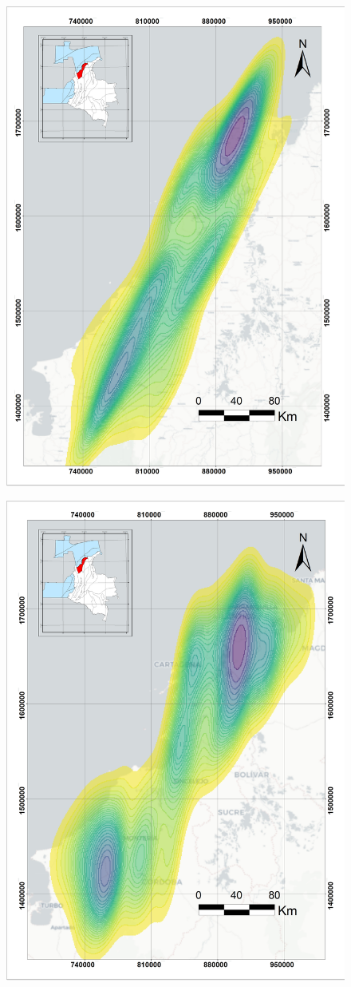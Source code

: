 \documentclass{ifacconf}
\begin{document}
\begin{figure}
	\centering
	\includegraphics[width=0.7\linewidth]{img/Kernel_Desnsity_Pozos}
	\caption[KDpozos]{}
	\label{fig:kerneldesnsitypozos}
\end{figure}
\begin{figure}
	\centering
	\includegraphics[width=0.7\linewidth]{img/Lineas2D_kde}
	\caption[KDlineas2d]{}
	\label{fig:lineas2dkde}
\end{figure}
\end{document}
